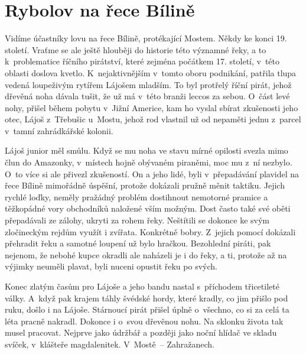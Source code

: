
\chapter{Rybolov na řece Bílině}

Vidíme účastníky lovu na řece Bílině, protékající Mostem. Někdy ke konci 19.
století. Vraťme se ale ještě hlouběji do historie této významné řeky, a to
k~problematice říčního pirátství, které zejména počátkem 17. století, v~této
oblasti doslova kvetlo. K~nejaktivnějším v~tomto oboru podnikání, patřila tlupa
vedená loupeživým rytířem Lájošem mladším. To byl protřelý říční pirát, jehož
dřevěná noha dávala tušit, že už má v~této branži leccos za sebou. O~část levé
nohy, přišel během pobytu v~Jižní Americe, kam ho vyslal sbírat zkušenosti jeho
otec, Lájoš z~Třebušic u~Mostu, jehož rod vlastnil už od nepaměti jednu
z~parcel v~tamní zahrádkářské kolonii.

Lájoš junior měl smůlu. Když se mu noha ve stavu mírné opilosti svezla mimo
člun do Amazonky, v~místech hojně obývaném piraněmi, moc mu z~ní nezbylo. O~to
více si ale přivezl zkušeností. On a jeho lidé, byli v~přepadávání plavidel na
řece Bílině mimořádně úspěšní, protože dokázali pružně měnit taktiku. Jejich
rychlé loďky, neměly pražádný problém dostihnout nemotorné pramice a těžkopádné
vory obchodníků naložené vším možným. Dost často také své oběti přepadávali ze
zálohy, ukryti za rohem řeky. Neštítili se dokonce ke svým zločineckým rejdům
využít i zvířata. Konkrétně bobry. Z~jejich pomocí dokázali přehradit řeku a
samotné loupení už bylo hračkou. Bezohlední piráti, pak nejenom, že nebohé
kupce okradli ale naházeli je i do řeky, a ti, protože až na výjimky neuměli
plavat, byli nuceni opustit řeku po svých.

Konec zlatým časům pro Lájoše a jeho bandu nastal s~příchodem třicetileté
války. A~když pak krajem táhly švédské hordy, které kradly, co jim přišlo pod
ruku, došlo i na Lájoše. Stárnoucí pirát přišel úplně o~všechno, co si za celá
ta léta pracně nakradl. Dokonce i o~svou dřevěnou nohu. Na sklonku života tak
musel pracovat. Nejprve jako údržbář a později jako noční hlídač ve skladu
svíček, v~klášteře magdalenitek. V~Mostě~-- Zahražanech.

